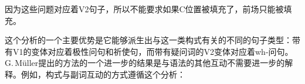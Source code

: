 \begin{exe}
\begin{xlist}[iv.]
\begin{exe}
\begin{xlist}[iv.]
\zl
因为这些问题对应着V2句子，所以不能要求如果C位置被填充了，前场只能被填充。

这个分析的一个主要优势是它能够派生出与这一类构式有关的不同的句子类型：带有V1的变体对应着极性问句和祈使句，而带有疑问词的V2变体对应着wh-问句。G.\,Müller提出的方法的一个进一步的结果是与语法的其他互动不需要进一步的解释。例如，构式与副词互动的方式遵循这个分析：
{
\eal
{}
\zl
\eal
{}}
\end{xlist}
\end{exe}
\end{xlist}
\end{exe}
